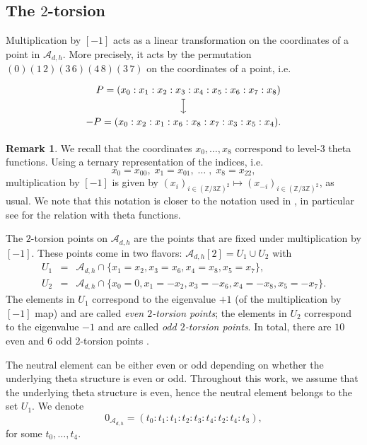 \documentclass[11pt]{amsart}
\theoremstyle{definition}
\newtheorem{remark}[theorem]{Remark}
\newcommand{\A}{\mathcal{A}}
\newcommand{\ZZ}{\mathbb{Z}}
\begin{document}
\subsection{The $2$-torsion} \label{subsec:two-torsion}

Multiplication by $[-1]$ acts as a linear transformation on the coordinates of a point in $\A_{d,h}$. More precisely, it acts by the permutation $(0)(1\,2)(3\,6)(4\,8)(3\,7)$ on the coordinates of a point, i.e.
\[
    \begin{tikzcd} [row sep = 15pt] 
    ~~~P = (x_0:x_1:x_2:x_3:x_4:x_5:x_6:x_7:x_8) \dar[maps to]\\
    - P = (x_0:x_2:x_1:x_6:x_8:x_7:x_3:x_5:x_4).
    \end{tikzcd}
\]

\begin{remark}
    We recall that the coordinates $x_0, \dots, x_8$ correspond to level-$3$ theta functions. Using a ternary representation of the indices, i.e. 
    \[
        x_0 = x_{00},\; x_1 = x_{01} , \;\dots 
        \;, \; x_8 = x_{22},
    \]
    multiplication by $[-1]$ is given by $(x_i)_{i\in (\ZZ/3\ZZ)^2} \mapsto (x_{-i})_{i\in (\ZZ/3\ZZ)^2}$, as usual. We note that this notation is closer to the notation used in \cite{gunji2006defining}, in particular see \cite[Section 3]{gunji2006defining} for the relation with theta functions.
\end{remark}

The $2$-torsion points on $\A_{d,h}$ are the points that are fixed under multiplication by $[-1]$. These points come in two flavors: $\A_{d,h}[2]= U_1 \cup U_2$ with
\begin{eqnarray*}
	U_1 & = & \A_{d,h} \cap \{x_1 = x_2, x_3 = x_6, x_4 = x_8, x_5 = x_7\}, \\
	U_2 & = & \A_{d,h} \cap \{x_0 = 0, x_1 = -x_2, x_3 = -x_6, x_4 = -x_8, x_5 = -x_7\}.
\end{eqnarray*}
The elements in $U_1$ correspond to the eigenvalue $+1$ (of the multiplication by $[-1]$ map) and are called {\em even $2$-torsion points}; the elements in $U_2$ correspond to the eigenvalue $-1$ and are called {\em odd $2$-torsion points}. In total, there are $10$ even and $6$ odd $2$-torsion points \cite[Section 5.3.1]{hunt2006burkhardt}.

The neutral element can be either even or odd depending on whether the underlying theta structure is even or odd. Throughout this work, we assume that the underlying theta structure is even, hence the neutral element belongs to the set $U_1$. We denote
\begin{equation} \label{eq:neutral-element}
	0_{\A_{d,h}}  = (t_0 : t_1 : t_1 : t_2 : t_3: t_4 : t_2 : t_4 : t_3),
\end{equation}
for some $t_0, \dots, t_4$. 
\end{document}

